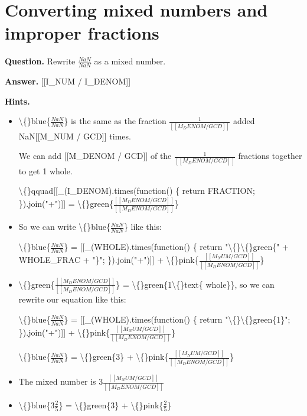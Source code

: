 \documentclass{article}
\begin{document}
\section*{Converting mixed numbers and improper fractions}
\textbf{Question.} Rewrite $\frac{NaN}{NaN}$ as a mixed number.

\textbf{Answer.} [[I\_NUM / I\_DENOM]]

\textbf{Hints.}
\begin{itemize}
  \item \textbackslash\{\}blue\{$\frac{NaN}{NaN}$\}
                                is the same as the fraction $\frac{1}{[[M_DENOM / GCD]]}$
                                added NaN[[M\_NUM / GCD]] times.
                            
                            
                                We can add [[M\_DENOM / GCD]] of the $\frac{1}{[[M_DENOM / GCD]]}$
                                fractions together to get 1 whole.
                            
                            
                                \textbackslash\{\}qquad[[\_(I\_DENOM).times(function() \{ return FRACTION; \}).join("+")]]
                                = \textbackslash\{\}green\{$\frac{[[M_DENOM / GCD]]}{[[M_DENOM / GCD]]}$\}
  \item So we can write \textbackslash\{\}blue\{$\frac{NaN}{NaN}$\} like this:
                            
                                \textbackslash\{\}blue\{$\frac{NaN}{NaN}$\} = 
                                [[\_(WHOLE).times(function() \{ return "\textbackslash\{\}\textbackslash\{\}green\{" + WHOLE\_FRAC + "\}"; \}).join("+")]]
                                + \textbackslash\{\}pink\{$\frac{[[M_NUM / GCD]]}{[[M_DENOM / GCD]]}$\}
  \item \textbackslash\{\}green\{$\frac{[[M_DENOM / GCD]]}{[[M_DENOM / GCD]]}$\} = \textbackslash\{\}green\{1\textbackslash\{\}text\{ whole\}\},
                                so we can rewrite our equation like this:
                            
                            
                                \textbackslash\{\}blue\{$\frac{NaN}{NaN}$\} = 
                                [[\_(WHOLE).times(function() \{ return "\textbackslash\{\}\textbackslash\{\}green\{1\}"; \}).join("+")]]
                                + \textbackslash\{\}pink\{$\frac{[[M_NUM / GCD]]}{[[M_DENOM / GCD]]}$\}
                            
                            
                                \textbackslash\{\}blue\{$\frac{NaN}{NaN}$\} =
                                \textbackslash\{\}green\{3\} + \textbackslash\{\}pink\{$\frac{[[M_NUM / GCD]]}{[[M_DENOM / GCD]]}$\}
  \item The mixed number is 3$\frac{[[M_NUM / GCD]]}{[[M_DENOM / GCD]]}$
  \item \textbackslash\{\}blue\{3$\frac{2}{5}$\} = 
                                \textbackslash\{\}green\{3\} + \textbackslash\{\}pink\{$\frac{2}{5}$\}
                            

\end{itemize}
\end{document}
